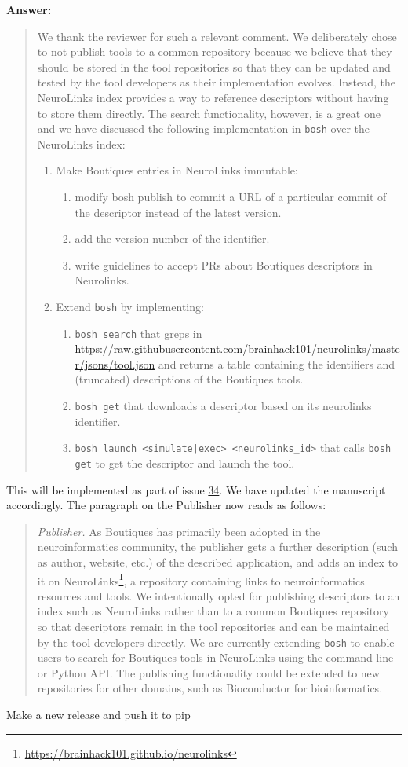 \documentclass[a4]{article}
\newenvironment{answer}%
{\textbf{Answer:}\begin{quote}}%
{\end{quote}}%
\newcommand{\todo}[1]{\color{red}#1\color{black}}
\begin{document}
\begin{answer}
We thank the reviewer for such a relevant comment. We deliberately
chose to not publish tools to a common repository because we believe
that they should be stored in the tool repositories so that they can
be updated and tested by the tool developers as their implementation
evolves. Instead, the NeuroLinks index provides a way to reference
descriptors without having to store them directly. The search
functionality, however, is a great one and we have discussed the following 
implementation in \texttt{bosh} over the NeuroLinks index:
\begin{enumerate}
\item Make Boutiques entries in NeuroLinks immutable:
  \begin{enumerate}
  \item modify bosh publish to commit a URL of a particular commit of the descriptor instead of the latest version.
  \item add the version number of the identifier.
  \item write guidelines to accept PRs about Boutiques descriptors in Neurolinks.
  \end{enumerate}
\item Extend \texttt{bosh} by implementing:
  \begin{enumerate}
  \item \texttt{bosh search} that greps in \url{https://raw.githubusercontent.com/brainhack101/neurolinks/master/jsons/tool.json} and returns a table containing the identifiers and (truncated) descriptions of the Boutiques tools. 
  \item \texttt{bosh get} that downloads a descriptor based on its neurolinks identifier.
  \item \texttt{bosh launch <simulate|exec> <neurolinks\_id>}  that calls \texttt{bosh get} to get the descriptor and launch the tool.
  \end{enumerate}
\end{enumerate}
\end{answer}
This will be implemented as part of issue \href{https://github.com/boutiques/boutiques/issues/34}{34}. We have updated the manuscript accordingly. The paragraph on the Publisher now reads as follows:
\begin{quote}
\emph{Publisher.} As Boutiques has primarily been adopted in the neuroinformatics
community, the publisher gets a further description (such as author,
website, etc.) of the described application, and adds an index to it
on
NeuroLinks\footnote{\url{https://brainhack101.github.io/neurolinks}},
a repository containing links to neuroinformatics resources and
tools. We intentionally opted for publishing descriptors to an index
such as NeuroLinks rather than to a common Boutiques repository so
that descriptors remain in the tool repositories and can be maintained
by the tool developers directly. We are currently extending
\texttt{bosh} to enable users to search for Boutiques tools in
NeuroLinks using the command-line or Python API. The publishing
functionality could be extended to new repositories for other domains,
such as Bioconductor for
bioinformatics.
\end{quote}



\todo{Make a new release and push it to pip}
\end{document}
